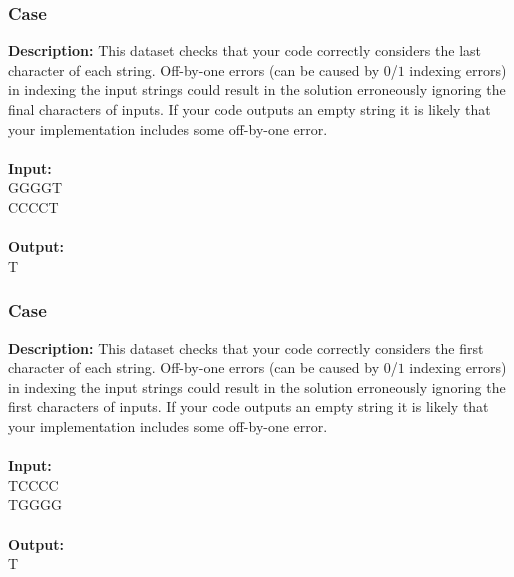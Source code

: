 \documentclass{article}
\newcommand{\code}[1]{{\fontfamily{pcr}\selectfont #1}}
\begin{document}
\subsubsection*{Case }
\hline \vspace{5}
\textbf{Description:} This dataset checks that your code correctly considers the last character of each string. Off-by-one errors (can be caused by $0$/$1$ indexing errors) in indexing the input strings could result in the solution erroneously ignoring the final characters of inputs. If your code outputs an empty string it is likely that your implementation includes some off-by-one error.\\ \\
\noindent \textbf{Input:}\\
\code{GGGGT\\CCCCT}\\ \\
\noindent \textbf{Output:}\\
\code{T}

\subsubsection*{Case }
\hline \vspace{5}
\textbf{Description:} This dataset checks that your code correctly considers the first character of each string. Off-by-one errors (can be caused by $0$/$1$ indexing errors) in indexing the input strings could result in the solution erroneously ignoring the first characters of inputs. If your code outputs an empty string it is likely that your implementation includes some off-by-one error.\\ \\
\noindent \textbf{Input:}\\
\code{TCCCC\\TGGGG}\\ \\
\noindent \textbf{Output:}\\
\code{T}
\end{document}
